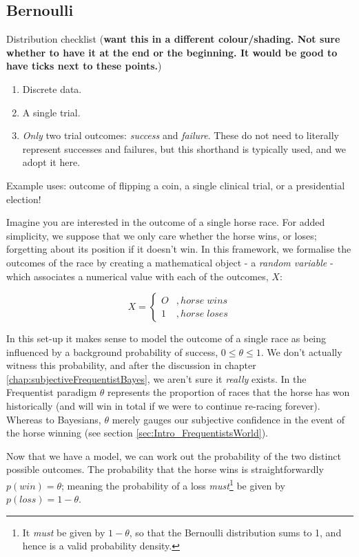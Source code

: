 \documentclass[11pt,fullpage]{book}
\begin{document}
\subsection{Bernoulli}\label{sec:Distributions_bernoulli}

Distribution checklist (\textbf{want this in a different colour/shading. Not sure whether to have it at the end or the beginning. It would be good to have ticks next to these points.})

\begin{enumerate}
\item Discrete data.
\item A single trial.
\item \textit{Only} two trial outcomes: \textit{success} and \textit{failure}. These do not need to literally represent successes and failures, but this shorthand is typically used, and we adopt it here.
\end{enumerate}

Example uses: outcome of flipping a coin, a single clinical trial, or a presidential election!

Imagine you are interested in the outcome of a single horse race. For added simplicity, we suppose that we only care whether the horse wins, or loses; forgetting about its position if it doesn't win. In this framework, we formalise the outcomes of the race by creating a mathematical object - a \textit{random variable} - which associates a numerical value with each of the outcomes, $X$:

\begin{equation}
X =
\begin{cases}
O & , horse\; wins \\
1 & , horse\; loses
\end{cases}
\end{equation}

In this set-up it makes sense to model the outcome of a single race as being influenced by a background probability of success, $0\leq\theta\leq 1$. We don't actually witness this probability, and after the discussion in chapter \ref{chap:subjectiveFrequentistBayes}, we aren't sure it \textit{really} exists. In the Frequentist paradigm $\theta$ represents the proportion of races that the horse has won historically (and will win in total if we were to continue re-racing forever). Whereas to Bayesians, $\theta$ merely gauges our subjective confidence in the event of the horse winning (see section \ref{sec:Intro_FrequentistsWorld}).

Now that we have a model, we can work out the probability of the two distinct possible outcomes. The probability that the horse wins is straightforwardly $p(win)=\theta$; meaning the probability of a loss \textit{must}\footnote{It \textit{must} be given by $1-\theta$, so that the Bernoulli distribution sums to 1, and hence is a valid probability density.} be given by $p(loss)=1-\theta$.
\end{document}
